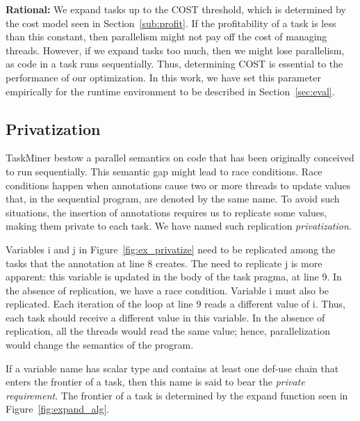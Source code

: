 \documentclass[sigplan,10pt,review,anonymous]{acmart}
\newcommand\Taskminer{\mbox{\textsf{TaskMiner}}}
\begin{document}
\noindent
\textbf{Rational:}
We expand tasks up to the \textsf{COST} threshold, which is determined
by the cost model seen in Section~\ref{sub:profit}.
If the profitability of a task is less than this constant, then parallelism
might not pay off the cost of managing threads.
However, if we expand tasks too much, then we might lose parallelism,
as code in a task runs sequentially.
Thus, determining \textsf{COST} is essential to the performance of our
optimization.
In this work, we have set this parameter empirically for the
runtime environment to be described in Section~\ref{sec:eval}.

\subsection{Privatization}
\label{sub:variance}

\Taskminer{} bestow a parallel semantics on code that has been originally
conceived to run sequentially.
This semantic gap might lead to race conditions.
Race conditions happen when annotations cause two or more threads to update
values that, in the sequential program, are denoted by the same name.
To avoid such situations, the insertion of annotations requires us to replicate
some values, making them private to each task.
We have named such replication {\em privatization}.

\begin{example}[Privatization]
\label{ex:priv}
Variables \textsf{i} and \textsf{j} in Figure~\ref{fig:ex_privatize} need to be
replicated among the tasks that the annotation at line 8 creates.
The need to replicate \textsf{j} is more apparent: this variable is updated in
the body of the task pragma, at line 9.
In the absence of replication, we have a race condition.
Variable \textsf{i} must also be replicated.
Each iteration of the loop at line 9 reads a different value of \textsf{i}.
Thus, each task should receive a different value in this variable.
In the absence of replication, all the threads would read the same value;  hence,
parallelization would change the semantics of the program.
\end{example}

\begin{definition}
\label{def:private}
If a variable name has scalar type and contains at least one def-use chain that
enters the frontier of a task, then this name is said to bear the {\em private
requirement}.
The frontier of a task is determined by the \textsf{expand} function seen in
Figure~\ref{fig:expand_alg}.
\end{definition}
\end{document}
